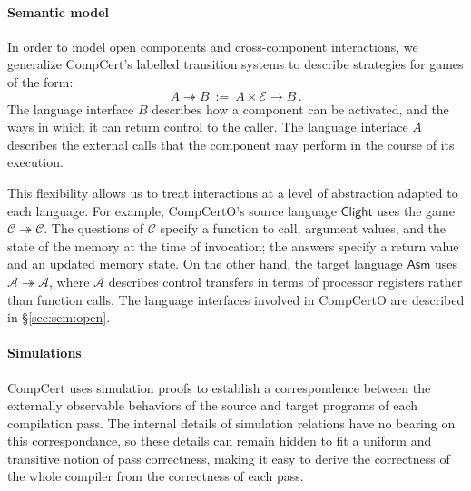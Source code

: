 \documentclass[acmsmall,authordraft]{acmart}
\newcommand{\kw}[1]{\ensuremath{ \mathsf{#1} }}
\begin{document}
\paragraph{Semantic model} %

In order to model open components and cross-component interactions,
we generalize CompCert's labelled transition systems
to describe strategies for games of the form:
\[ A \twoheadrightarrow B \: := \:
   A \times \mathcal{E} \rightarrow B \,. \]
The language interface $B$ describes how a component can be activated,
and the ways in which it can return control to the caller.
The language interface $A$ describes the external calls that the component
may perform in the course of its execution.

This flexibility allows us to treat interactions
at a level of abstraction adapted to each language.
For example, CompCertO's source language \kw{Clight} uses the game
\mbox{$\mathcal{C} \twoheadrightarrow \mathcal{C}$}.
The questions of $\mathcal{C}$ specify a function to call,
argument values,
and the state of the memory at the time of invocation;
the answers specify a return value and an updated memory state.
On the other hand, the target language \kw{Asm} uses
$\mathcal{A} \twoheadrightarrow \mathcal{A}$,
where $\mathcal{A}$ describes control transfers
in terms of processor registers
rather than function calls.
The language interfaces involved in CompCertO
are described in \S\ref{sec:sem:open}.



\paragraph{Simulations} %

CompCert uses simulation proofs
to establish a correspondence between
the externally observable behaviors of
the source and target programs of each compilation pass.
The internal details of simulation relations
have no bearing on this correspondance,
so these details can remain hidden
to fit a uniform and transitive notion of pass correctness,
making it easy to derive the correctness
of the whole compiler
from the correctness of each pass.
\end{document}
